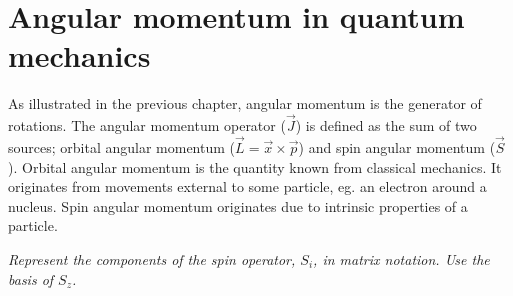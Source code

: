 \chapter{Angular momentum in quantum mechanics}
As illustrated in the previous chapter, angular momentum is the generator of rotations. The angular momentum operator ($\vec{J}$) is defined as the sum of two sources; orbital angular momentum ($\vec{L}=\vec{x}\times \vec{p}$) and spin angular momentum ($\vec{S}$). Orbital angular momentum is the quantity known from classical mechanics. It originates from movements external to some particle, eg. an electron around a nucleus. Spin angular momentum originates due to intrinsic properties of a particle. 
\begin{example}
	\emph{Represent the components of the spin operator, $S_i$, in matrix notation. Use the basis of $S_z$.}\newline
	

\end{example}
